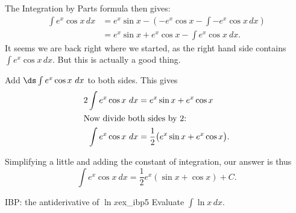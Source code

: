 \begin{solution}
{	The Integration by Parts formula then gives:
	\begin{align*}
	\int e^x\cos x\,dx &= e^x\sin x - \left(-e^x\cos x - \int -e^x\cos x\,dx\right)\\
	&= e^x\sin x+ e^x\cos x - \int e^x\cos x\ dx.
	\end{align*}
	It seems we are back right where we started, as the right hand side contains $\int e^x\cos x\,dx$.  But this is actually a good thing.  
	
	Add $\ds\int e^x\cos x\ dx$ to both sides. This gives 
	\begin{align*}
	2\int e^x\cos x\ dx & = e^x\sin x + e^x\cos x \\
	\intertext{Now divide both sides by 2:}
	\int e^x\cos x\ dx & = \frac{1}{2}\big(e^x\sin x + e^x\cos x\big).
	\end{align*}
	
	Simplifying a little and adding the constant of integration, our answer is thus
	$$\int e^x\cos x\ dx = \frac12e^x\left(\sin x + \cos x\right)+C.$$
	\vskip-15pt
}	
\end{solution}	
								
								
\begin{example}{IBP: the antiderivative of $\ln x$}{ex_ibp5}
{Evaluate $\displaystyle \int \ln x\,dx$.}	
\end{example}									
								
